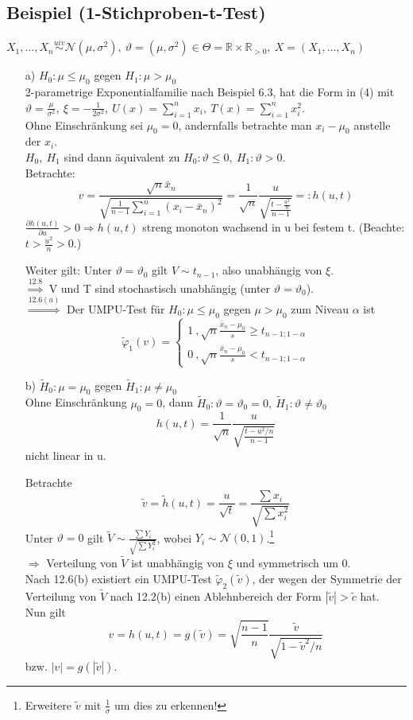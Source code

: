 \documentclass[a4paper,11pt,twoside,titlepage]{article}
\newcommand{\R}{{\mathbb R}}
\newcommand\NN{ \mathcal{N} } %
\newcommand{\uiv}{\ensuremath{\stackrel{uiv}{\sim}}}
\begin{document}
\subsection{Beispiel (1-Stichproben-t-Test)}
$X_1,\ldots,X_n\uiv\NN(\mu,\sigma^2),\ \vartheta=(\mu,\sigma^2)\in\Theta=\R\times\R_{>0},\ X=(X_1,\ldots,X_n)$
\begin{itemize}
\item[a) ] $H_0:\mu\leq\mu_0$ gegen $H_1:\mu>\mu_0$\\
2-parametrige Exponentialfamilie nach Beispiel 6.3, hat die Form in (4) mit $\vartheta=\frac{\mu}{\sigma^2},\ \xi=-\frac{1}{2\sigma^2},\ U(x)=\sum_{i=1}^nx_i,\ T(x)=\sum_{i=1}^nx_i^2$.\\
Ohne Einschränkung sei $\mu_0=0$, andernfalls betrachte man $x_i-\mu_0$ anstelle der $x_i$.\\
$H_0,\ H_1$ sind dann äquivalent zu $H_0: \vartheta\leq 0,\ H_1: \vartheta>0$.\\
Betrachte:
$$v=\frac{\sqrt{n}\bar{x}_n}{\sqrt{\frac{1}{n-1}\sum_{i=1}^n(x_i-\bar{x}_n)^2}}=
\frac{1}{\sqrt{n}}\frac{u}{\sqrt{\frac{t-\frac{u^2}{n}}{n-1}}}=:h(u,t)$$
$\frac{\partial h(u,t)}{\partial u}>0\Rightarrow h(u,t)$ streng monoton wachsend in u
bei festem t. (Beachte: $t>\frac{u^2}{n}>0$.)

Weiter gilt: Unter $\vartheta = \vartheta_0$ gilt $V\sim t_{n-1}$, also unabhängig von $\xi$.\\
$\stackrel{12.8}{\Rightarrow}$ V und T sind stochastisch unabhängig (unter $\vartheta=\vartheta_0$).\\
$\stackrel{12.6(a)}{\Rightarrow}$ Der UMPU-Test für $H_0:\mu\leq\mu_0$ gegen $\mu>\mu_0$ zum Niveau $\alpha$ ist
$$\widetilde\varphi_1(v)=\left\{\begin{matrix}
1\ ,\sqrt{n}\frac{\bar{x}_n-\mu_0}{s}\geq t_{n-1;1-\alpha}\\0\ ,\sqrt{n}\frac{\bar{x}_n-\mu_0}{s}< t_{n-1;1-\alpha}\end{matrix}\right.$$
\item[b) ] $\tilde H_0: \mu=\mu_0$ gegen $\tilde H_1:\mu\neq\mu_0$\\
Ohne Einschränkung $\mu_0=0$, dann $\tilde H_0: \vartheta=\vartheta_0=0,\ \tilde H_1:\vartheta\neq\vartheta_0$
\[h(u,t)=\frac{1}{\sqrt n}\frac{u}{\sqrt{\frac{t-u^2/n}{n-1}}}\]
nicht linear in u.

Betrachte
\[\tilde v=\tilde h(u,t)=\frac{u}{\sqrt{t}}=\frac{\sum x_i}{\sqrt{\sum x_i^2}}\]
Unter $\vartheta=0$ gilt $\tilde V\sim\frac{\sum Y_i}{\sqrt{\sum Y_i^2}}$, wobei $Y_i\sim\NN(0,1)$.\footnote{Erweitere $\tilde v$ mit $\frac1\sigma$ um dies zu erkennen!}\\
$\Rightarrow$ Verteilung von $\tilde V$ ist unabhängig von $\xi$ und symmetrisch um 0.\\
Nach 12.6(b) existiert ein UMPU-Test $\tilde\varphi_2(\tilde v)$, der wegen der Symmetrie der Verteilung von $\tilde V$ nach 12.2(b) einen Ablehnbereich der Form $|\tilde v|>\tilde c$ hat.\\
Nun gilt
\[v=h(u,t)=g(\tilde v)=\sqrt{\frac{n-1}{n}}\frac{\tilde v}{\sqrt{1-\tilde v^2/n}}\]
bzw. $|v|=g(|\tilde v|)$.


\end{itemize}
\end{document}
